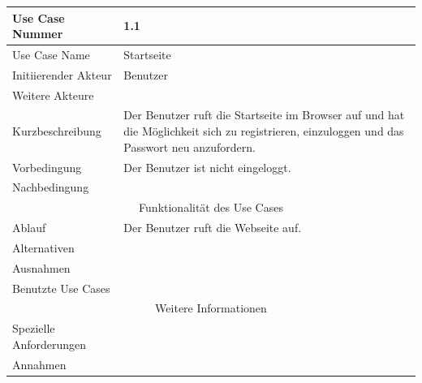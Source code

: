 \documentclass[10pt,a4paper]{article}
\begin{document}
	\begin{tabular}{|l|p{.5\linewidth}|}
	\hline Use Case Nummer & 1.1 \\ 
	\hline Use Case Name & Startseite \\ 
	\hline Initiierender Akteur & Benutzer \\
	\hline Weitere Akteure &  \\
	\hline Kurzbeschreibung & Der Benutzer ruft die Startseite im Browser auf und hat die M\"oglichkeit sich zu registrieren, einzuloggen und das Passwort neu anzufordern. \\
	\hline Vorbedingung & Der Benutzer ist nicht eingeloggt. \\
	\hline Nachbedingung &  \\
	\hline \multicolumn{2}{|c|}{Funktionalität des Use Cases}\\
	\hline Ablauf & Der Benutzer ruft die Webseite auf. \\
	\hline Alternativen &  \\
	\hline Ausnahmen &  \\
	\hline Benutzte Use Cases &  \\
	\hline \multicolumn{2}{|c|}{Weitere Informationen} \\
	\hline Spezielle Anforderungen &  \\
	\hline Annahmen &  \\
	\hline
	\end{tabular} 
\end{document}
